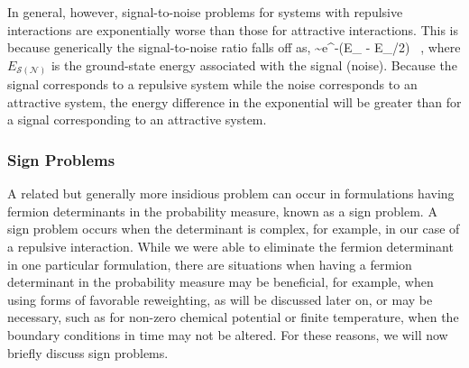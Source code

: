 In general, however, signal-to-noise problems for systems with repulsive interactions are exponentially worse than those for attractive interactions. This is because generically the signal-to-noise ratio falls off as,
\beq
{} \sim e^{-\left(E_{} - E_{}/2\right)\tau} \ ,
\eeq
where $E_{\mathcal{S}(\mathcal{N})}$ is the ground-state energy associated with the signal (noise). Because the signal corresponds to a repulsive system while the noise corresponds to an attractive system, the energy difference in the exponential will be greater than for a signal corresponding to an attractive system. 

\subsubsection{\label{sec:sign}Sign Problems}
A related but generally more insidious problem can occur in formulations having fermion determinants in the probability measure, known as a sign problem. A sign problem occurs when the determinant is complex, for example, in our case of a repulsive interaction. While we were able to eliminate the fermion determinant in one particular formulation, there are situations when having a fermion determinant in the probability measure may be beneficial, for example, when using forms of favorable reweighting, as will be discussed later on, or may be necessary, such as for non-zero chemical potential or finite temperature, when the boundary conditions in time may not be altered. For these reasons, we will now briefly discuss sign problems. 

